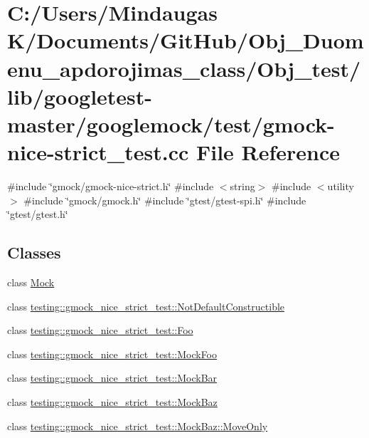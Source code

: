 \hypertarget{_obj__test_2lib_2googletest-master_2googlemock_2test_2gmock-nice-strict__test_8cc}{}\section{C\+:/\+Users/\+Mindaugas K/\+Documents/\+Git\+Hub/\+Obj\+\_\+\+Duomenu\+\_\+apdorojimas\+\_\+class/\+Obj\+\_\+test/lib/googletest-\/master/googlemock/test/gmock-\/nice-\/strict\+\_\+test.cc File Reference}
\label{_obj__test_2lib_2googletest-master_2googlemock_2test_2gmock-nice-strict__test_8cc}
{\ttfamily \#include \char`\"{}gmock/gmock-\/nice-\/strict.\+h\char`\"{}}\newline
{\ttfamily \#include $<$string$>$}\newline
{\ttfamily \#include $<$utility$>$}\newline
{\ttfamily \#include \char`\"{}gmock/gmock.\+h\char`\"{}}\newline
{\ttfamily \#include \char`\"{}gtest/gtest-\/spi.\+h\char`\"{}}\newline
{\ttfamily \#include \char`\"{}gtest/gtest.\+h\char`\"{}}\newline
\subsection*{Classes}
\begin{DoxyCompactItemize}
\item 
class \mbox{\hyperlink{class_mock}{Mock}}
\item 
class \mbox{\hyperlink{classtesting_1_1gmock__nice__strict__test_1_1_not_default_constructible}{testing\+::gmock\+\_\+nice\+\_\+strict\+\_\+test\+::\+Not\+Default\+Constructible}}
\item 
class \mbox{\hyperlink{classtesting_1_1gmock__nice__strict__test_1_1_foo}{testing\+::gmock\+\_\+nice\+\_\+strict\+\_\+test\+::\+Foo}}
\item 
class \mbox{\hyperlink{classtesting_1_1gmock__nice__strict__test_1_1_mock_foo}{testing\+::gmock\+\_\+nice\+\_\+strict\+\_\+test\+::\+Mock\+Foo}}
\item 
class \mbox{\hyperlink{classtesting_1_1gmock__nice__strict__test_1_1_mock_bar}{testing\+::gmock\+\_\+nice\+\_\+strict\+\_\+test\+::\+Mock\+Bar}}
\item 
class \mbox{\hyperlink{classtesting_1_1gmock__nice__strict__test_1_1_mock_baz}{testing\+::gmock\+\_\+nice\+\_\+strict\+\_\+test\+::\+Mock\+Baz}}
\item 
class \mbox{\hyperlink{classtesting_1_1gmock__nice__strict__test_1_1_mock_baz_1_1_move_only}{testing\+::gmock\+\_\+nice\+\_\+strict\+\_\+test\+::\+Mock\+Baz\+::\+Move\+Only}}
\end{DoxyCompactItemize}
